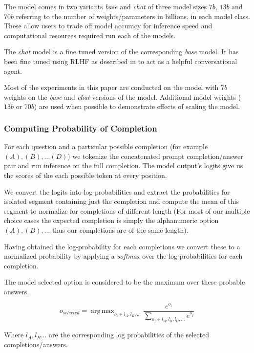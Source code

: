 \documentclass[11pt]{article}
\DeclareMathOperator*{\argmax}{arg\,max}
\begin{document}
The model comes in two variants \emph{base} and \emph{chat} of three model sizes $7b$, $13b$ and $70b$ referring to the number of weights/parameters in billions, in each model class. These allow users to trade off model accuracy for inference speed and computational resources required run each of the models. 

The \emph{chat} model is a fine tuned version of the 
corresponding \emph{base} model. It has been fine tuned using 
RLHF as described in \cite{ouyang2022training} to act 
as a helpful conversational agent.

Most of the experiments in this paper are conducted on the model 
with $7b$ weights on the \emph{base} and \emph{chat} versions of 
the model. Additional model weights ($13b$ or $70b$) 
are used when possible to demonstrate effects of scaling 
the model.

\subsubsection{Computing Probability of Completion}

For each question and a particular possible completion (for example $(A), (B), \dots (D)$)  we tokenize the concatenated prompt completion/answer pair and run inference on the full completion. The model output's logits give us the scores of the each possible token at every position. 

We convert the logits into log-probabilities and extract the probabilities for isolated segment containing just the completion  and compute the mean of this segment to 
normalize for completions of different length (For most of our multiple choice cases the expected completion is simply the alphanumeric option $(A), (B), \dots $ thus our completions are of the same length).

Having obtained the log-probability for each completions we convert these to a normalized probability by applying a 
\emph{softmax} over the log-probabilities for 
each completion. 

The model selected option is considered to be the 
maximum over these probable answers. 

\begin{equation}
    o_{selected} = \argmax_{o_i \in l_A, l_B, \dots}  
    \frac{e^{o_i}}{\sum_{o_j \in l_A, l_B, l_C, \dots} e^{o_j}} 
\end{equation}

Where $l_A, l_B\dots$ are the corresponding log probabilities of the selected completions/answers.
\end{document}
